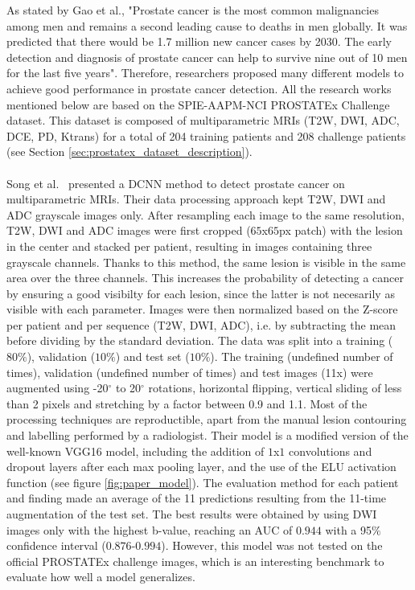 \setlength{\marginparwidth}{3cm}\leavevmode {}As stated by Gao et al., "Prostate  cancer  is  the  most  common  malignancies  among  men  and  remains  a  second  leading  cause to deaths in men globally. It was predicted that there would be 1.7 million new cancer cases by 2030. The early detection and diagnosis of prostate cancer can help to survive nine out of 10 men for the last five years"\cite{41}. Therefore, researchers proposed many different models to achieve good performance in prostate cancer detection. All the research works mentioned below are based on the SPIE-AAPM-NCI PROSTATEx Challenge dataset. This dataset is composed of multiparametric MRIs (T2W, DWI, ADC, DCE, PD, Ktrans) for a total of 204 training patients and 208 challenge patients (see Section \ref{sec:prostatex_dataset_description}).\\ \\
Song et al.~\cite{07} presented a DCNN method to detect prostate cancer on multiparametric MRIs. Their data processing approach kept T2W, DWI and ADC grayscale images only. After resampling each image to the same resolution, T2W, DWI and ADC images were first cropped ($65$x$65$px patch) with the lesion in the center and stacked per patient, resulting in images containing three grayscale channels. Thanks to this method, the same lesion is visible in the same area over the three channels. This increases the probability of detecting a cancer by ensuring a good visibilty for each lesion, since the latter is not necesarily as visible with each parameter. Images were then normalized based on the Z-score per patient and per sequence (T2W, DWI, ADC), i.e. by subtracting the mean before dividing by the standard deviation. The data was split into a training ($80\%$), validation ($10\%$) and test set ($10\%$). The training (undefined number of times), validation (undefined number of times) and test images (11x) were augmented using -20$^\circ$ to 20$^\circ$ rotations, horizontal flipping, vertical sliding of less than 2 pixels and stretching by a factor between 0.9 and 1.1. Most of the processing techniques are reproductible, apart from the manual lesion contouring and labelling performed by a radiologist. 
Their model is a modified version of the well-known VGG16 model, including the addition of $1$x$1$ convolutions and dropout layers after each max pooling layer, and the use of the ELU activation function (see figure \ref{fig:paper_model}). The evaluation method for each patient and finding made an average of the 11 predictions resulting from the 11-time augmentation of the test set. The best results were obtained by using DWI images only with the highest b-value, reaching an AUC of $0.944$ with a 95$\%$ confidence interval ($0.876$-$0.994$). However, this model was not tested on the official PROSTATEx challenge images, which is an interesting benchmark to evaluate how well a model generalizes.\\ \\

